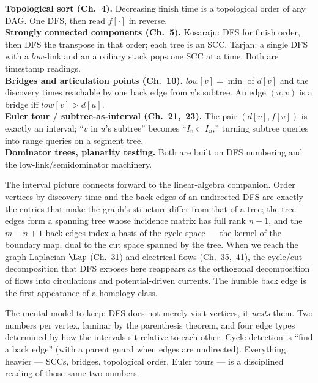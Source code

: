 \begin{applicationbox}
\textbf{Topological sort (Ch.~4).} Decreasing finish time is a topological order of any DAG. One DFS, then read $f[\cdot]$ in reverse. \\[2pt]
\textbf{Strongly connected components (Ch.~5).} Kosaraju: DFS for finish order, then DFS the transpose in that order; each tree is an SCC. Tarjan: a single DFS with a $\mathit{low}$-link and an auxiliary stack pops one SCC at a time. Both are timestamp readings. \\[2pt]
\textbf{Bridges and articulation points (Ch.~10).} $\mathit{low}[v]=\min$ of $d[v]$ and the discovery times reachable by one back edge from $v$'s subtree. An edge $(u,v)$ is a bridge iff $\mathit{low}[v]>d[u]$. \\[2pt]
\textbf{Euler tour / subtree-as-interval (Ch.~21,~23).} The pair $(d[v],f[v])$ is exactly an interval; ``$v$ in $u$'s subtree'' becomes ``$I_v\subset I_u$,'' turning subtree queries into range queries on a segment tree. \\[2pt]
\textbf{Dominator trees, planarity testing.} Both are built on DFS numbering and the low-link/semidominator machinery.
\end{applicationbox}

\begin{connectionbox}
The interval picture connects forward to the linear-algebra companion. Order vertices by discovery time and the back edges of an undirected DFS are exactly the entries that make the graph's structure differ from that of a tree; the tree edges form a spanning tree whose incidence matrix has full rank $n-1$, and the $m-n+1$ back edges index a basis of the cycle space --- the kernel of the boundary map, dual to the cut space spanned by the tree. When we reach the graph Laplacian $\Lap$ (Ch.~31) and electrical flows (Ch.~35,~41), the cycle/cut decomposition that DFS exposes here reappears as the orthogonal decomposition of flows into circulations and potential-driven currents. The humble back edge is the first appearance of a homology class.
\end{connectionbox}

\begin{recoverybox}
The mental model to keep: DFS does not merely visit vertices, it \emph{nests} them. Two numbers per vertex, laminar by the parenthesis theorem, and four edge types determined by how the intervals sit relative to each other. Cycle detection is ``find a back edge'' (with a parent guard when edges are undirected). Everything heavier --- SCCs, bridges, topological order, Euler tours --- is a disciplined reading of those same two numbers.
\end{recoverybox}

